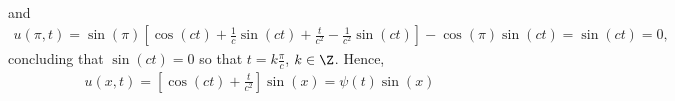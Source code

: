 \begin{questions}
\begin{solution}
\begin{align*}
\end{align*}
and
\begin{align*}
u(\pi,t)=\sin(\pi)\left[\cos(ct)+\frac{1}{c}\sin{(ct)}+\frac{t}{c^2}-\frac{1}{c^2}\sin{(ct)}\right]-\cos(\pi)\sin(ct)=\sin(ct)=0,
\end{align*}
concluding that $\sin(ct)=0$ so that $t=k\frac{\pi}{c}$, $k\in\Z$.
Hence,
\begin{align*}
u(x,t)=\left[\cos(ct)+\frac{t}{c^2}\right]\sin(x)=\psi(t)\sin(x)
\end{align*}
\end{solution}
\end{questions}